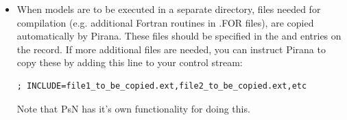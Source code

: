 {{{{\begin{itemize}
Note that Pirana reads these decriptions from the model file (and
not from the output file). To be read correctly, covariance block need
to be specified as:

\begin{lstlisting}
$OMEGA BLOCK(2)
0.1 ; IIV CL/F
0.05 ; COV CL~V
0.1 ; IIV V/F
\end{lstlisting}

or as:

\begin{lstlisting}
$OMEGA BLOCK(3)
0.1           ; IIV CL/F
0.05 0.1      ; IIV V/F
0.01 0.05 0.1 ; IIV KA
\end{lstlisting}

\item When models are to be executed in a separate directory, files
  needed for compilation (e.g. additional Fortran routines in .FOR
  files), are copied automatically by Pirana. These files should be
  specified in the  \normalfont and 
  \normalfont entries on the  \normalfont record. If
  more additional files are needed, you can instruct Pirana to copy
  these by adding this line to your control stream:

\begin{lstlisting}
; INCLUDE=file1_to_be_copied.ext,file2_to_be_copied.ext,etc
\end{lstlisting}

Note that PsN has it's own functionality for doing this.

\end{itemize}

}}}}

